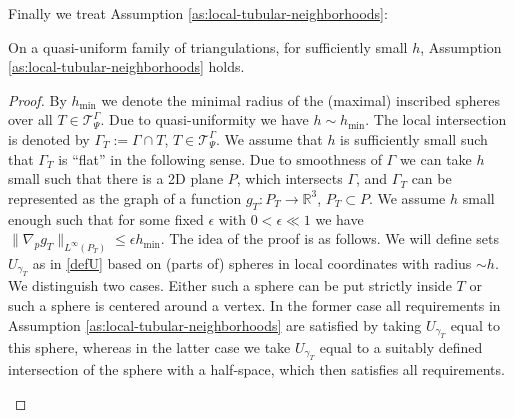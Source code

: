 \documentclass[final]{siamltex}
\begin{document}
\noindent
Finally we treat Assumption \ref{as:local-tubular-neighborhoods}:
\begin{lemma}\label{la:as-local-tubular-neighborhoods}
  On a quasi-uniform family of triangulations, for sufficiently small $h$, Assumption \ref{as:local-tubular-neighborhoods} holds.
\end{lemma}
\begin{proof}
By $h_{\min}$ we denote the minimal radius of the (maximal) inscribed spheres over all $T \in {\mathcal{T}}^\Gamma_\Psi$. Due to quasi-uniformity we have $h \sim h_{\min}$. The local intersection is denoted by $\Gamma_T:= \Gamma \cap T$, $T \in {\mathcal{T}}^\Gamma_\Psi$.
We assume that $h$ is sufficiently small such that $\Gamma_T$ is ``flat'' in the following sense. Due to smoothness of $\Gamma$ we can take $h$ small such that there is a 2D plane $P$, which intersects $\Gamma$, and $\Gamma_T$ can be represented as the graph of a function $g_T: P_T \to \mathbb{R}^3$, $P_T \subset P$. We assume $h$ small enough such that for some fixed $\epsilon$ with $0 < \epsilon \ll 1$ we have $\|\nabla_p g_T\|_{L^\infty(P_T)} \leq \epsilon h_{\min}$. 
The idea of the proof is as follows.
We will define sets $U_{\gamma_T}$ as in \eqref{defU} based on (parts of) spheres in local coordinates with radius $\sim h$. We distinguish two cases. Either such a sphere can be put strictly inside $T$ or such a sphere is centered around a vertex. In the former case all requirements in Assumption \ref{as:local-tubular-neighborhoods} are satisfied by taking $U_{\gamma_T}$ equal to this sphere, whereas in the latter case we take $U_{\gamma_T}$ equal to a suitably defined intersection of the sphere with a half-space, which then satisfies all requirements.

\begin{figure}
\end{figure}
\end{proof}
\end{document}
